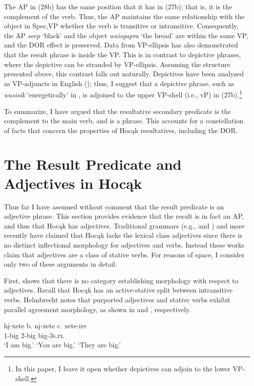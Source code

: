 \documentclass[output=paper]{LSP/langsci}
\begin{document}
The AP in (28b) has the same position that it has in (27b); that is, it is the complement of the verb. Thus, the AP maintains the same relationship with the object in Spec,VP whether the verb is transitive or intransitive. Consequently, the AP \textit{seep} `black' and the object \textit{waisgapra} `the bread' are within the same VP, and the DOR effect is preserved. Data from VP-ellipsis has also demonstrated that the result phrase is inside the VP. This is in contrast to depictive phrases, where the depictive can be stranded by VP-ellipsis. Assuming the structure presented above, this contrast falls out naturally. Depictives have been analyzed as VP-adjuncts in English (\citealt{LevinRappaportHovav1995}); thus, I suggest that a depictive phrase, such as \textit{wasisik} `energetically' in , is adjoined to the upper VP-shell (i.e., vP) in (27b).\footnote{In this paper, I leave it open whether depictives can adjoin to the lower VP-shell.}

To summarize, I have argued that the resultative secondary predicate is the complement to the main verb, and is a phrase. This accounts for a constellation of facts that concern the properties of Hocąk resultatives, including the DOR.

\section{The Result Predicate and Adjectives in Hocąk} \label{sec:rosen:5}

Thus far I have assumed without comment that the result predicate is an adjective phrase. This section provides evidence that the result is in fact an AP, and thus that Hocąk has adjectives. Traditional grammars (e.g., \citealt{Lipkind1945} and \citealt{Susman1943}) and more recently \citet{Helmbrecht2006b} have claimed that Hocąk lacks the lexical class adjectives since there is no distinct inflectional morphology for adjectives and verbs. Instead these works claim that adjectives are a class of stative verbs. For reasons of space, I consider only two of these arguments in detail.

First, \citet{Helmbrecht2006b} shows that there is no category establishing morphology with respect to adjectives. Recall that Hocąk has an active-stative split between intransitive verbs. Helmbrecht notes that purported adjectives and stative verbs exhibit parallel agreement morphology, as shown in  and , respectively.

\begin{exe}
\ex\label{ex:rosen:29}
\begin{xlist}
\ex \gll
hį-xete \hspace{36pt} b. {}  nį-xete \hspace{48pt} c. {} xete-ire\\
1-big {} {} {} 2-big {} {}  {} big-\textsc{3s.pl}\\
\glt `I am big.' \hspace{1.2cm} `You are big.' \hspace{1.1cm} `They are big.'

\end{xlist}
\end{exe}
\end{document}

